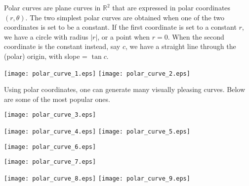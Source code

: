 \documentclass[12pt]{article}
\begin{document}
Polar curves are plane curves in $\mathbb{R}^2$ that are expressed in polar coordinates $(r,\theta)$.  The two simplest polar curves are obtained when one of the two coordinates is set to be a constant.  If the first coordinate is set to a constant $r$, we have a circle with radius $\lvert r \rvert$, or a point when $r=0$.  When the second coordinate is the constant instead, say $c$, we have a straight line through the (polar) origin, with slope = $\tan c$.


\begin{center}
\texttt{[image: polar\_curve\_1.eps]}
\hspace{1in}
\texttt{[image: polar\_curve\_2.eps]}
\end{center}

Using polar coordinates, one can generate many visually pleasing
curves.  Below are some of the most popular ones.

\begin{center}
\texttt{[image: polar\_curve\_3.eps]}
\end{center}
\vspace{10pt}
\begin{center}
\texttt{[image: polar\_curve\_4.eps]}
\hspace{1in}
\texttt{[image: polar\_curve\_5.eps]}
\end{center}
\vspace{10pt}
\begin{center}
\texttt{[image: polar\_curve\_6.eps]}
\end{center}
\vspace{10pt}
\begin{center}
\texttt{[image: polar\_curve\_7.eps]}
\end{center}
\vspace{10pt}
\begin{center}
\texttt{[image: polar\_curve\_8.eps]}
\hspace{1in}
\texttt{[image: polar\_curve\_9.eps]}
\end{center}
\end{document}

